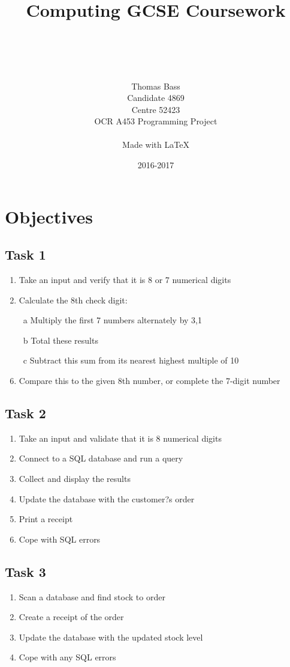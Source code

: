 \documentclass[a4paper]{article}
\title{Computing GCSE Coursework}
\author{\\ \\ \\ \\ Thomas Bass\\Candidate 4869\\Centre 52423\\OCR A453 Programming Project\\\\Made with \LaTeX}
\date{2016-2017}
\begin{document}
\maketitle
\pagebreak
\renewcommand*\contentsname{Summary}
\tableofcontents
\pagebreak
\section{Objectives}

\subsection{Task 1}
\begin{enumerate}
\item{Take an input and verify that it is 8 or 7 numerical digits}
\item{Calculate the 8th check digit:}
\item[~a]{Multiply the first 7 numbers alternately by 3,1}
\item[~b]{Total these results}
\item[~c]{Subtract this sum from its nearest highest multiple of 10}
\item{Compare this to the given 8th number, or complete the 7-digit number}
\end{enumerate}

\subsection{Task 2}
\begin{enumerate}
\item{Take an input and validate that it is 8 numerical digits}
\item{Connect to a SQL database and run a query}
\item{Collect and display the results}
\item{Update the database with the customer?s order}
\item{Print a receipt}
\item{Cope with SQL errors}
\end{enumerate}

\subsection{Task 3}
\begin{enumerate}
\item{Scan a database and find stock to order}
\item{Create a receipt of the order}
\item{Update the database with the updated stock level}
\item{Cope with any SQL errors}
\end{enumerate}
\end{document}
